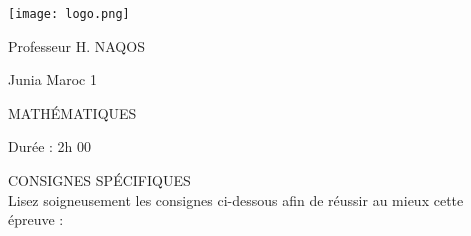 \documentclass{book}%
\begin{document}
%
\normalsize%
\newpage%
\thispagestyle{empty}%
\vskip-40mm	\texttt{[image: logo.png]} \\%
 \begin{flushright}  \vskip-20mm   Professeur H. NAQOS\vskip15mm  \end{flushright}%
Junia Maroc 1%
\begin{center}   \begin{Large}MATHÉMATIQUES\end{Large} \end{center}%
Durée : 2h 00%
 \begin{center} { \large CONSIGNES SPÉCIFIQUES } \\ Lisez soigneusement les consignes ci-dessous afin de réussir au mieux cette épreuve : \end{center} %
\end{document}
